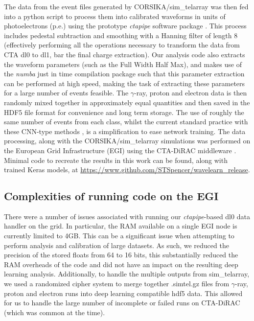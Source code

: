 The data from the event files generated by CORSIKA/sim\_telarray was then fed into a python script to process them into calibrated waveforms in units of photoelectrons (p.e.) using the prototype \textit{ctapipe} software package \cite{ctapipe}\cite{ctapipe2}. This process includes pedestal subtraction and smoothing with a Hanning filter \cite{hanning} of length 8 (effectively performing all the operations necessary to transform the data from CTA dl0 to dl1, bar the final charge extraction). Our analysis code also extracts the waveform parameters (such as the Full Width Half Max), and makes use of the \textit{numba} \cite{numba} just in time compilation package such that this parameter extraction can be performed at high speed, making the task of extracting these parameters for a large number of events feasible. The $\gamma$-ray, proton and electron data is then randomly mixed together in approximately equal quantities and then saved in the HDF5 \cite{hdf} file format for convenience and long term storage. The use of roughly the same number of events from each class, whilst the current standard practice with these CNN-type methods \cite{Shilon}, is a simplification to ease network training. The data processing, along with the CORSIKA/sim\_telarray simulations was performed on the European Grid Infrastructure (EGI) using the CTA-DiRAC middleware \cite{luisa}. Minimal code to recreate the results in this work can be found, along with trained Keras models, at \url{https://www.github.com/STSpencer/wavelearn\_release}.

\subsection{Complexities of running code on the EGI}
There were a number of issues associated with running our \textit{ctapipe}-based dl0 data handler on the grid. In particular, the RAM available on a single EGI node is currently limited to 4GB. This can be a significant issue when attempting to perform analysis and calibration of large datasets. As such, we reduced the precision of the stored floats from 64 to 16 bits, this substantially reduced the RAM overheads of the code and did not have an impact on the resulting deep learning analysis. Additionally, to handle the multiple outputs from sim\_telarray, we used a randomized cipher system to merge together .simtel.gz files from $\gamma$-ray, proton and electron runs into deep learning compatible hdf5 data. This allowed for us to handle the large number of incomplete or failed runs on CTA-DiRAC (which was common at the time).

